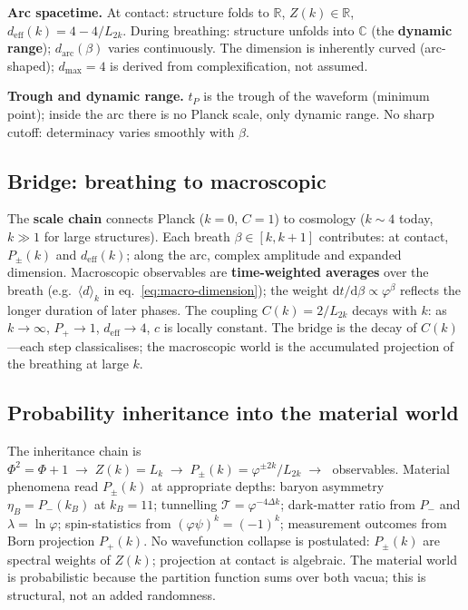 \documentclass[12pt,a4paper]{article}
\begin{document}
\textbf{Arc spacetime.} At contact: structure folds to $\mathbb{R}$, $Z(k) \in \mathbb{R}$, $d_{\mathrm{eff}}(k) = 4 - 4/L_{2k}$. During breathing: structure unfolds into $\mathbb{C}$ (the \textbf{dynamic range}); $d_{\mathrm{arc}}(\beta)$ varies continuously. The dimension is inherently curved (arc-shaped); $d_{\max} = 4$ is derived from complexification, not assumed.

\textbf{Trough and dynamic range.} $t_P$ is the trough of the waveform (minimum point); inside the arc there is no Planck scale, only dynamic range. No sharp cutoff: determinacy varies smoothly with $\beta$.

\subsection{Bridge: breathing to macroscopic}
\label{sec:bridge-macro}

The \textbf{scale chain} connects Planck ($k=0$, $C=1$) to cosmology ($k \sim 4$ today, $k \gg 1$ for large structures). Each breath $\beta \in [k,k+1]$ contributes: at contact, $P_\pm(k)$ and $d_{\mathrm{eff}}(k)$; along the arc, complex amplitude and expanded dimension. Macroscopic observables are \textbf{time-weighted averages} over the breath (e.g.\ $\langle d \rangle_k$ in eq.~\ref{eq:macro-dimension}); the weight $\mathrm{d}t/\mathrm{d}\beta \propto \varphi^\beta$ reflects the longer duration of later phases. The coupling $C(k) = 2/L_{2k}$ decays with $k$: as $k \to \infty$, $P_+ \to 1$, $d_{\mathrm{eff}} \to 4$, $c$ is locally constant. The bridge is the decay of $C(k)$---each step classicalises; the macroscopic world is the accumulated projection of the breathing at large $k$.

\subsection{Probability inheritance into the material world}
\label{sec:prob-inheritance}

The inheritance chain is $\Phi^2 = \Phi + 1 \;\to\; Z(k) = L_k \;\to\; P_\pm(k) = \varphi^{\pm 2k}/L_{2k} \;\to\;$ observables. Material phenomena read $P_\pm(k)$ at appropriate depths: baryon asymmetry $\eta_B = P_-(k_B)$ at $k_B = 11$; tunnelling $\mathcal{T} = \varphi^{-4\Delta k}$; dark-matter ratio from $P_-$ and $\lambda = \ln\varphi$; spin-statistics from $(\varphi\psi)^k = (-1)^k$; measurement outcomes from Born projection $P_+(k)$. No wavefunction collapse is postulated: $P_\pm(k)$ are spectral weights of $Z(k)$; projection at contact is algebraic. The material world is probabilistic because the partition function sums over both vacua; this is structural, not an added randomness.
\end{document}
